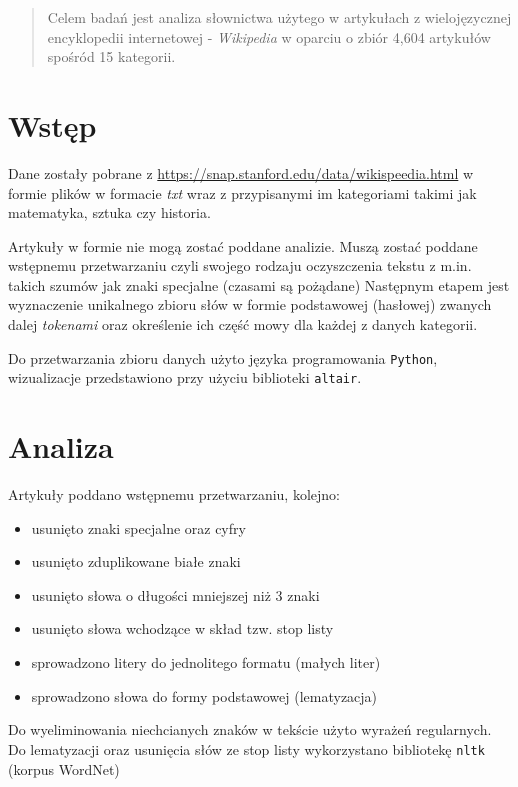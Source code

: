 \documentclass{article}
\begin{document}


\begin{abstract}
Celem badań jest analiza słownictwa użytego w artykułach z wielojęzycznej encyklopedii internetowej - \textit{Wikipedia} w oparciu o zbiór 4,604 artykułów spośród 15 kategorii.
\end{abstract}

\section{Wstęp}

Dane zostały pobrane z \url{https://snap.stanford.edu/data/wikispeedia.html} w formie plików w formacie \textit{txt} wraz z przypisanymi im kategoriami takimi jak matematyka, sztuka czy historia.

Artykuły w  formie nie mogą zostać poddane analizie. Muszą zostać poddane wstępnemu przetwarzaniu czyli swojego rodzaju oczyszczenia tekstu z m.in. takich szumów jak znaki specjalne (czasami są pożądane) Następnym etapem jest wyznaczenie unikalnego zbioru słów w formie podstawowej (hasłowej) zwanych dalej \textit{tokenami} oraz określenie ich część mowy dla każdej z danych kategorii.

Do przetwarzania zbioru danych użyto języka programowania \texttt{Python}, wizualizacje przedstawiono przy
użyciu biblioteki \texttt{altair}.

\section{Analiza}

Artykuły poddano wstępnemu przetwarzaniu, kolejno:
\begin{itemize}
    \item usunięto znaki specjalne oraz cyfry
    \item usunięto zduplikowane białe znaki
    \item usunięto słowa o długości mniejszej niż 3 znaki
    \item usunięto słowa wchodzące w skład tzw. stop listy
    \item sprowadzono litery do jednolitego formatu (małych liter)
    \item sprowadzono słowa do formy podstawowej (lematyzacja)
\end{itemize}

Do wyeliminowania niechcianych znaków w tekście użyto wyrażeń regularnych.
Do lematyzacji oraz usunięcia słów ze stop listy wykorzystano bibliotekę \texttt{nltk} (korpus WordNet)
\vspace{0.5cm}
\end{document}
